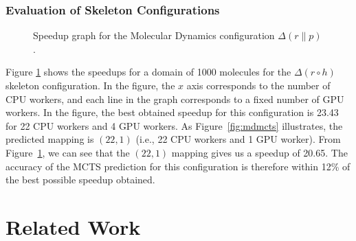 \documentclass[smallextended]{svjour3}
\begin{document}
\subsubsection{Evaluation of Skeleton Configurations}
\begin{figure}[t!]
\begin{center}
\caption{Speedup graph for the Molecular Dynamics configuration
  $\Delta(r \parallel p)$.}
\label{MD1}
\end{center}
\end{figure}

Figure \ref{MD1} shows the speedups for a domain of 1000 molecules for the $\Delta(r \circ h)$ skeleton configuration.
In the figure, the $x$ axis corresponds to the number of CPU workers, and each
line in the graph corresponds to a fixed number of GPU workers.
In the figure, the best obtained speedup for this configuration is 23.43 for 22 CPU workers and 4 GPU workers.
As Figure~\ref{fig:mdmcts} illustrates, the predicted mapping is $(22,1)$ (i.e., 22 CPU workers and 1 GPU worker).
From Figure~\ref{MD1}, we can see that the $(22,1)$ mapping gives us a speedup of 20.65. The accuracy of the MCTS prediction for this
configuration is therefore within 12\% of the best possible speedup obtained.

\section{Related Work}
\end{document}
